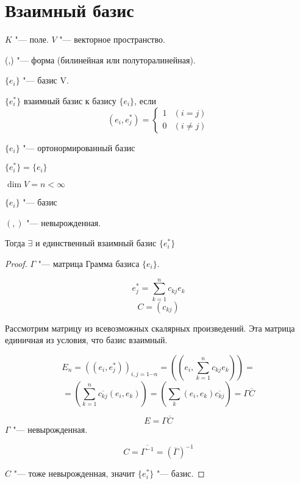 \section{Взаимный базис}
$K$ "--- поле.
$V$ "---  векторное пространство. 

(,) "--- форма (билинейная или полуторалинейная). 

$\{e_i\}$ "--- базис V.

\begin{Def}
  
    $\{e_i^*\}$  взаимный базис к базису $\{e_i\}$, если 
    $$(e_i, e_j^*) = \left\{ \begin{array}{cc} 1& (i = j) \\ 0 &(i \ne j) \end{array} \right.$$
\end{Def}

\begin{exmp}

$\{e_i\}$ "--- ортонормированный базис

$\{e_i^*\} = \{e_i\}$
\end{exmp}

\begin{theorem}{}

$\dim V = n < \infty$

$\{e_i\}$ "--- базис   

$(, )$ "--- невырожденная. 

Тогда $\exists$  и единственный взаимный базис $\{e_i^*\}$
\end{theorem}

\begin{proof}

$\Gamma$ "--- матрица Грамма базиса $\{e_i\}$.

$$e_j^* = \sum_{k = 1}^{n} c_{kj}e_k$$
$$C = (c_{kj})$$

Рассмотрим матрицу из всевозможных скалярных произведений.  Эта матрица единичная из условия, что базис взаимный. 

$$E_{n} = ((e_i, e_j^*))_{i, j = 1 \cdots n} = ((e_i, \sum_{k = 1}^{n}c_{kj}e_k)) = $$
$$= (\sum_{k = 1}^{n}\overline{c_{kj}}(e_i, e_k)) = (\sum_{k}(e_i, e_k)\overline{c_{kj}}) = \Gamma \overline{C}$$

$$E = \Gamma \overline{C}$$
$\Gamma$ "--- невырожденная.

$$C = \overline{\Gamma^{-1}} = (\overline{\Gamma})^{-1} $$

$C$ "--- тоже невырожденная, значит $\{e_i^*\}$ "--- базис. 
\end{proof}